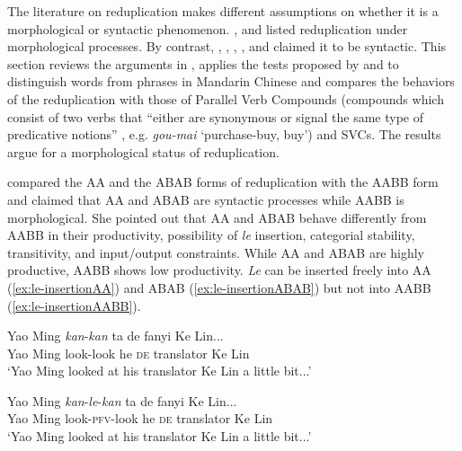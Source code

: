 The literature on reduplication makes different assumptions on whether it is a morphological or syntactic phenomenon.
\citet[Ch. 4]{Chao1968}, \citet[Ch. 3]{LiThompson1981} and \citet[4--5]{Liao2014} listed reduplication under morphological processes. 
By contrast, \citet[23]{Arcodiaetal2014}, \citet{Xiong2016}, \citet[146]{BascianoMelloni2017}, \citet[229--231]{YangWei2017}, \citet[330]{MelloniBasciano2018} and \citet{Xie2020}  claimed it to be syntactic.
This section reviews the arguments in \citet{Xie2020}, applies the tests proposed by \citet{Duanmu1998} and \citet{Schaefer2009} to distinguish words from phrases in Mandarin Chinese 
and compares the behaviors of the reduplication with those of Parallel Verb Compounds 
(compounds which consist of two verbs that ``either are synonymous or signal the same type of predicative notions'' \citep[68]{LiThompson1981}, e.g. \textit{gou-mai} `purchase-buy, buy') and {SVC}s. 
The results argue for a morphological status of reduplication.



\citet{Xie2020} compared the AA and the ABAB forms of reduplication with the AABB form and claimed that AA and ABAB are syntactic processes while AABB is morphological.
She pointed out that AA and ABAB behave differently from AABB in their productivity, possibility of \textit{le} insertion, categorial stability, transitivity, and input/output constraints.
While AA and ABAB are highly productive, AABB shows low productivity. 
\textit{Le} can be inserted freely into AA (\ref{ex:le-insertionAA}) and ABAB (\ref{ex:le-insertionABAB}) but not into AABB (\ref{ex:le-insertionAABB}).

\settowidth{}

\ea\label{ex:le-insertionAA}
  \ea \gll Yao Ming \textit{kan}-\textit{kan} ta de fanyi Ke Lin...\\
  Yao Ming look-look he \textsc{de} translator Ke Lin\\
  \glt `Yao Ming looked at his translator Ke Lin a little bit...'
  
  \ex \gll Yao Ming \textit{kan}-\textit{le}-\textit{kan} ta de fanyi Ke Lin...\\
  Yao Ming look-\textsc{pfv}-look he \textsc{de} translator Ke Lin\\ 
  \glt `Yao Ming looked at his translator Ke Lin a little bit...'
  \z
\z

